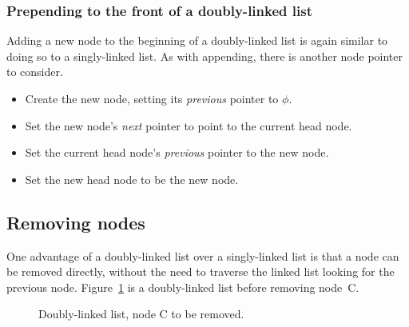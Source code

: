\documentclass{article}
\begin{document}
  \subsubsection{Prepending to the front of a doubly-linked list}
  Adding a new node to the beginning of a doubly-linked list is again similar to doing so to a singly-linked list. As with appending, there is another node pointer to consider.
  \begin{itemize}
    \item Create the new node, setting its \emph{previous} pointer to $\phi$.
    \item Set the new node's \emph{next} pointer to point to the current head node.
    \item Set the current head node's \emph{previous} pointer to the new node.
    \item Set the new head node to be the new node.
  \end{itemize}

  \subsection{Removing nodes}
  One advantage of a doubly-linked list over a singly-linked list is that a node can be removed directly, without the need to traverse the linked list looking for the previous node. Figure~\ref{fig:doublelinkedlist-before-remove} is a doubly-linked list before removing node~C.
  \begin{figure}[H]
    \centering
    \caption{Doubly-linked list, node C to be removed.}
    \label{fig:doublelinkedlist-before-remove}
  \end{figure}
\end{document}
